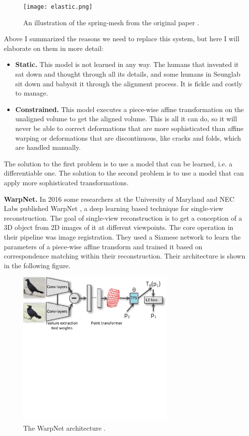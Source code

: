 \documentclass[12pt,a4paper]{article}
\begin{document}
\begin{figure}[H]
\centering
\texttt{[image: elastic.png]}
\caption{\label{fig:elastic}An illustration of the spring-mesh from the original paper \cite{elastic_alignment}.}
\end{figure}

Above I summarized the reasons we need to replace this system, but here I will elaborate on them in more detail:
\begin{itemize} 
  \item {\bf Static.} This model is not learned in any way. The humans that invented it sat down and thought through all its details, and some humans in Seunglab sit down and babysit it through the alignment process. It is fickle and costly to manage.
  \item {\bf Constrained.} This model executes a piece-wise affine transformation on the unaligned volume to get the aligned volume. This is all it can do, so it will never be able to correct deformations that are more sophisticated than affine warping or deformations that are discontinuous, like cracks and folds, which are handled manually.
\end{itemize}

The solution to the first problem is to use a model that can be learned, i.e. a differentiable one. The solution to the second problem is to use a model that can apply more sophisticated transformations.

{\bf WarpNet.} In 2016 some researchers at the University of Maryland and NEC Labs published WarpNet \cite{warpnet}, a deep learning based technique for single-view reconstruction. The goal of single-view reconstruction is to get a conception of a 3D object from 2D images of it at different viewpoints. The core operation in their pipeline was image registration. They used a Siamese network to learn the parameters of a piece-wise affine transform and trained it based on correspondence matching within their reconstruction. Their architecture is shown in the following figure.

\begin{figure}[h!]
\centering
\includegraphics[width=0.7\textwidth]{warp_arch.pdf}
\caption{\label{fig:warpnet}The WarpNet architecture \cite{warpnet}.}
\end{figure}
\end{document}
